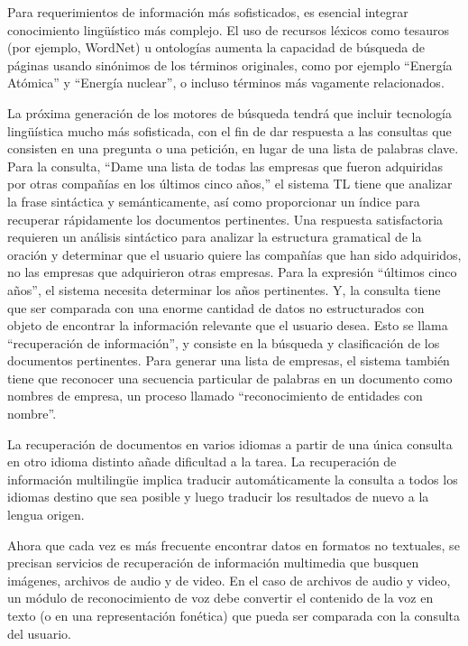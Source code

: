 \begin{multicols}{2}
Para requerimientos de información más sofisticados, es esencial  integrar conocimiento lingüístico más complejo. El uso de recursos léxicos como tesauros (por ejemplo, WordNet) u ontologías aumenta la capacidad de búsqueda de páginas usando sinónimos de los términos originales, como por ejemplo ``Energía Atómica'' y ``Energía nuclear'', o incluso términos más vagamente relacionados.

La próxima generación de los motores de búsqueda tendrá que incluir tecnología lingüística mucho más sofisticada, con el fin de dar respuesta a las consultas que consisten en una pregunta o una petición, en lugar de una lista de palabras clave. Para la consulta, ``Dame una lista de todas las empresas que fueron adquiridas por otras compañías en los últimos cinco años,'' el sistema TL tiene que analizar la frase sintáctica y semánticamente, así como proporcionar un índice para recuperar rápidamente los documentos pertinentes. Una respuesta satisfactoria requieren un análisis sintáctico para analizar la estructura gramatical de la oración y determinar que el usuario quiere las compañías que han sido adquiridos, no las empresas que adquirieron otras empresas. Para la expresión “últimos cinco años”, el sistema necesita determinar los años pertinentes. Y, la consulta tiene que ser comparada con una enorme cantidad de datos no estructurados con objeto de encontrar la información relevante que el usuario desea. Esto se llama ``recuperación de información'', y consiste en la búsqueda y clasificación de los documentos pertinentes. Para generar una lista de empresas, el sistema también tiene que reconocer una secuencia particular de  palabras en un documento como nombres de empresa, un proceso llamado ``reconocimiento de entidades con nombre''.

La recuperación de documentos en varios idiomas a partir de una única consulta en otro idioma distinto añade dificultad a la tarea. La recuperación de información multilingüe implica traducir automáticamente la consulta a todos los idiomas destino que sea posible y luego traducir los resultados de nuevo a la lengua origen.

Ahora que cada vez es más frecuente encontrar datos en formatos no textuales, se precisan servicios de recuperación de información multimedia que busquen imágenes, archivos de audio y de video. En el caso de archivos de audio y video, un módulo de reconocimiento de voz debe convertir el contenido de la voz en texto (o en una representación fonética) que pueda ser comparada con la consulta del usuario.


\end{multicols}
